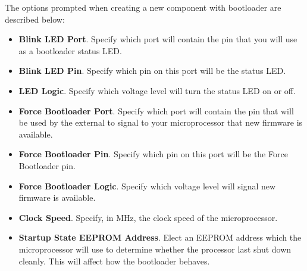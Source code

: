 \documentclass[a4paper, oneside, 11pt, titlepage, onecolumn, openright]{article}
\begin{document}
The options prompted when creating a new component with bootloader are described below:
\begin{itemize}

\item \textbf{Blink LED Port}. Specify which port will contain the pin that you will use as a bootloader status LED.

\item \textbf{Blink LED Pin}. Specify which pin on this port will be the status LED.

\item \textbf{LED Logic}. Specify which voltage level will turn the status LED on or off.

\item \textbf{Force Bootloader Port}. Specify which port will contain the pin that will be used by the external to signal to your microprocessor that new firmware is available.

\item \textbf{Force Bootloader Pin}. Specify which pin on this port will be the Force Bootloader pin.


\item \textbf{Force Bootloader Logic}. Specify which voltage level will signal new firmware is available.

\item \textbf{Clock Speed}. Specify, in MHz, the clock speed of the microprocessor.

\item \textbf{Startup State EEPROM Address}. Elect an EEPROM address which the microprocessor will use to determine whether the processor last shut down cleanly. This will affect how the bootloader behaves.

\end{itemize}


	\appendix
\end{document}
